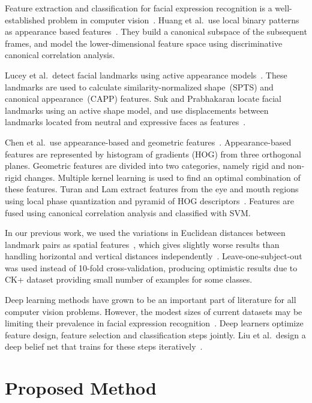 \documentclass[hyperfootnotes=false]{article}
\begin{document}
Feature extraction and classification for facial expression recognition is a well-established problem in computer vision~\cite{Pantic:2000,Fasel:2003}.
Huang et al.\ use local binary patterns as appearance based features~\cite{Huang:2014}.
They build a canonical subspace of the subsequent frames, and model the lower-dimensional feature space using discriminative canonical correlation analysis.

Lucey et al.\ detect facial landmarks using active appearance models~\cite{Lucey:2010}.
These landmarks are used to calculate similarity-normalized shape~(SPTS) and canonical appearance~(CAPP) features.
Suk and Prabhakaran locate facial landmarks using an active shape model, and use displacements between landmarks located from neutral and expressive faces as features~\cite{Suk:2014}.

Chen et al.\ use appearance-based and geometric features~\cite{Chen:2015}.
Appearance-based features are represented by histogram of gradients (HOG) from three orthogonal planes. 
Geometric features are divided into two categories, namely rigid and non-rigid changes.
Multiple kernel learning is used to find an optimal combination of these features.
Turan and Lam extract features from the eye and mouth regions using local phase quantization and pyramid of HOG descriptors~\cite{Turan:2014}.
Features are fused using canonical correlation analysis and classified with SVM.

In our previous work, we used the variations in Euclidean distances between landmark pairs as spatial features~\cite{Gacav:2016}, which gives slightly worse results than handling horizontal and vertical distances independently~\cite{Lucey:2010}.
Leave-one-subject-out was used instead of 10-fold cross-validation, producing optimistic results due to CK+ dataset providing small number of examples for some classes.

Deep learning methods have grown to be an important part of literature for all computer vision problems.
However, the modest sizes of current datasets may be limiting their prevalence in facial expression recognition~\cite{Lucey:2010,Lyons:1998}.
Deep learners optimize feature design, feature selection and classification steps jointly.
Liu et al.\ design a deep belief net that trains for these steps iteratively~\cite{Liu:2014}.

\section{Proposed Method}
\end{document}
